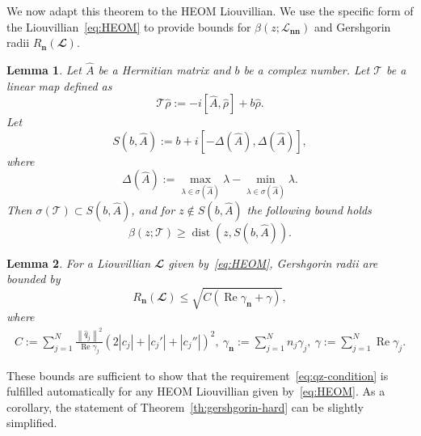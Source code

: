 \documentclass{SciPost}
\renewcommand{\Re}{\operatorname{Re}}
\newtheorem{lemma}{Lemma}
\begin{document}
We now adapt this theorem to the HEOM Liouvillian. We use the specific form of the Liouvillian~\eqref{eq:HEOM} to provide bounds for $\beta(z; \mathcal L_{\bm{nn}})$ and Gershgorin radii $R_{\bm n}(\mathbfcal L)$.
\begin{lemma}
    Let $\hat A$ be a Hermitian matrix and $b$ be a complex number. Let $\mathcal T$ be a linear map defined as
    $$\mathcal T \hat \rho := -i \left[\hat A, \hat \rho\right] + b \hat \rho.$$ 
    Let $$S\left(b, \hat A\right) := b + i\left[-\Delta\left(\hat A\right), \Delta\left(\hat A\right)\right], $$ where 
    $$\Delta\left(\hat A\right) := \max_{\lambda \in \sigma(\hat A)} \lambda - \min_{\lambda \in \sigma(\hat A)} \lambda.$$
    Then $\sigma(\mathcal T) \subset S\left(b, \hat A\right)$, and for $z \notin S(b, \hat A)$ the following bound holds
    \begin{equation}
        \beta(z; \mathcal T) \geqslant \operatorname{dist}\left(z, S\left(b, \hat A\right)\right).
    \end{equation}
    \label{lemma:inv-diagonal}
\end{lemma}
\begin{lemma}
    For a Liouvillian $\mathbfcal L$ given by~\eqref{eq:HEOM}, Gershgorin radii are bounded by
    \begin{equation}
        R_{\bm n}(\mathbfcal L)
        \leqslant
        \sqrt{C(\Re \gamma_{\bm n} + \gamma)},
        \label{eq:bound-off-diag}
    \end{equation}
    where
    \begin{equation}
        \begin{gathered}
            C := \sum\limits_{j=1}^N 
            \frac{\left \| \hat q_j \right \|^2}{
            \Re \gamma_j
            }
            \left(
            2 |c_j| + |c_j'| + |c_j''|
            \right) ^ 2,~
            \gamma_{\bm n} := \sum\limits_{j=1}^N n_j \gamma_j,~
            \gamma := \sum\limits_{j=1}^N \Re \gamma_j.
        \end{gathered}
    \end{equation}
    \label{lemma:gershgorin-radii}
\end{lemma}
These bounds are sufficient to show that the requirement~\eqref{eq:qz-condition} is fulfilled automatically for any HEOM Liouvillian given by~\eqref{eq:HEOM}. As a corollary, the statement of Theorem~\ref{th:gershgorin-hard} can be slightly simplified.
\end{document}
